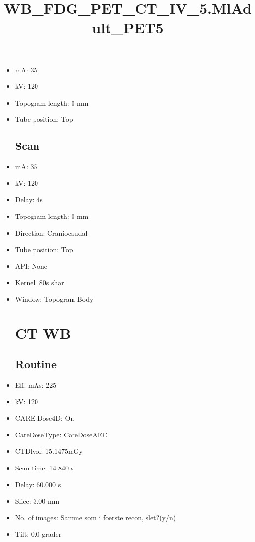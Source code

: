 \documentclass[12pt]{article}
\title{WB\_FDG\_PET\_CT\_IV\_5.MlAdult\_PET5}
\begin{document}
\maketitle
\newpage
\tableofcontents
\newpage
{}


\begin{itemize}\section{Topogram}
\subsection{Routine}
\item mA: 35\item kV: 120\item Topogram length: 0 mm\item Tube position: Top
\subsection{Scan}\item mA: 35\item kV: 120\item Delay: 4s\item Topogram length: 0 mm\item Direction: Craniocaudal\item Tube position: Top\item API: None\item Kernel: 80s shar\item Window: Topogram Body
\section{CT WB}
\subsection{Routine}
\item Eff. mAs: 225\item kV: 120\item CARE Dose4D: On\item CareDoseType: CareDoseAEC\item CTDlvol: 15.1475mGy\item Scan time: 14.840 s\item Delay: 60.000 s\item Slice: 3.00 mm\item No. of images: Samme som i foerste recon, slet?(y/n)\item Tilt: 0.0 grader

\end{itemize}
\end{document}
